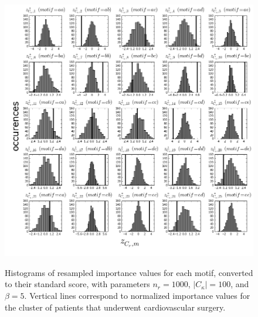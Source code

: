 \begin{enumerate}
\begin{figure}
  \includegraphics[scale=0.35]{./Figures/5x5hist_standardscore.png}\\
  \caption{Histograms of resampled importance values for each motif, converted to their standard score, with parameters $n_r=1000$, $|C_\kappa|=100$, and $\beta=5$. Vertical lines correspond to normalized importance values for the cluster of patients that underwent cardiovascular surgery.}\label{fig:5x5hist_standardscore}
\end{figure}

\end{enumerate} 